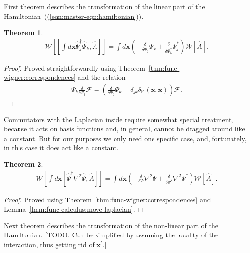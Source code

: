 \documentclass[12pt,aip,jmp,amssymb,amsmath]{revtex4-1}
\newtheorem{theorem}{Theorem}
\begin{document}
First theorem describes the transformation of the linear part of the Hamiltonian~((\ref{eqn:master-eqn:hamiltonian})).

\begin{theorem}
\label{thm:transformations:w-commutator1}
    \begin{eqnarray*}
        \mathcal{W} \left[ [\int d\boldsymbol{x} \hat{\Psi}_j^\dagger \hat{\Psi}_k, \hat{A}] \right]
        = \int d\boldsymbol{x} \left(
            - \frac{\delta}{\delta \Psi_j} \Psi_k
            + \frac{\delta}{\delta \Psi_k^*} \Psi_j^*
        \right) \mathcal{W}[\hat{A}].
    \end{eqnarray*}
\end{theorem}
\begin{proof}
Proved straightforwardly using Theorem~\ref{thm:func-wigner:correspondences} and the relation
\begin{eqnarray}
    \Psi_k \frac{\delta}{\delta \Psi_j} \mathcal{F}
    = \left(
        \frac{\delta}{\delta \Psi_j} \Psi_k
        - \delta_{jk} \delta_{\mathbb{M}}(\boldsymbol{x}, \boldsymbol{x})
    \right) \mathcal{F}.
\end{eqnarray}
\end{proof}

Commutators with the Laplacian inside require somewhat special treatment, because it acts on basis functions and, in general, cannot be dragged around like a constant.
But for our purposes we only need one specific case, and, fortunately, in this case it does act like a constant.

\begin{theorem}
\label{thm:transformations:w-laplacian-commutator1}
    \begin{eqnarray*}
        \mathcal{W} \left[
            \int d\boldsymbol{x} [\hat{\Psi}^\dagger \nabla^2 \hat{\Psi}, \hat{A}]
        \right]
        = \int d\boldsymbol{x} \left(
            - \frac{\delta}{\delta \Psi} \nabla^2 \Psi
            + \frac{\delta}{\delta \Psi^*} \nabla^2 \Psi^*
        \right) \mathcal{W}[\hat{A}].
    \end{eqnarray*}
\end{theorem}
\begin{proof}
Proved using Theorem~\ref{thm:func-wigner:correspondences} and Lemma~\ref{lmm:func-calculus:move-laplacian}.
\end{proof}

Next theorem describes the transformation of the non-linear part of the Hamiltonian.
[TODO: Can be simplified by assuming the locality of the interaction, thus getting rid of $\boldsymbol{x}^\prime$.]
\end{document}
